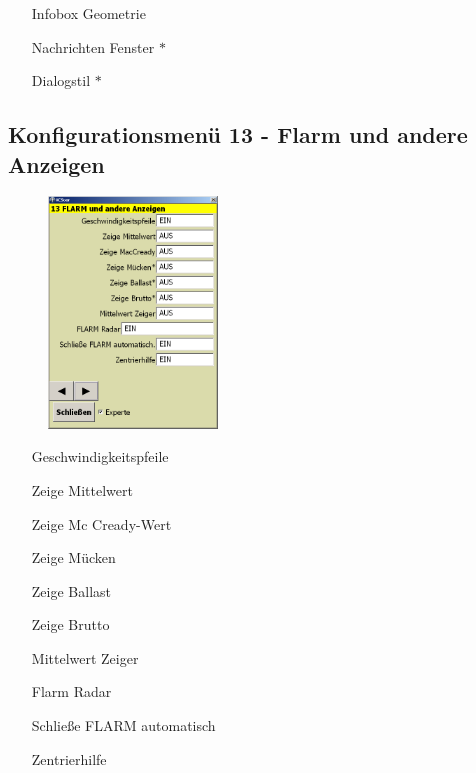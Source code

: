 \begin{enumerate}
\item[Infobox Geometrie]
\item[Nachrichten Fenster $\ast$]
\item[Dialogstil $\ast$]
\end{enumerate}

\subsection{Konfigurationsmenü 13 - Flarm und andere Anzeigen}\label{Konfig13}
\begin{figure}
\includegraphics[width=4.5cm]{Bilder/Konfig13FLARM.png}
\end{figure}
\begin{enumerate}
\item[Geschwindigkeitspfeile]
\item[Zeige Mittelwert]
\item[Zeige Mc Cready-Wert]
\item[Zeige Mücken]
\item[Zeige Ballast]
\item[Zeige Brutto]
\item[Mittelwert Zeiger]
\item[Flarm Radar]
\item[Schließe FLARM automatisch]
\item[Zentrierhilfe]
\end{enumerate}


